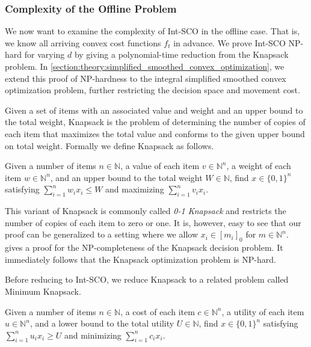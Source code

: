 \subsubsection{Complexity of the Offline Problem}

We now want to examine the complexity of Int-SCO in the offline case. That is, we know all arriving convex cost functions $f_t$ in advance. We prove Int-SCO NP-hard for varying $d$ by giving a polynomial-time reduction from the Knapsack problem. In \cref{section:theory:simplified_smoothed_convex_optimization}, we extend this proof of NP-hardness to the integral simplified smoothed convex optimization problem, further restricting the decision space and movement cost.

Given a set of items with an associated value and weight and an upper bound to the total weight, Knapsack is the problem of determining the number of copies of each item that maximizes the total value and conforms to the given upper bound on total weight. Formally we define Knapsack as follows.

\begin{problem}[Knapsack (KP)]
Given a number of items $n \in \mathbb{N}$, a value of each item $v \in \mathbb{N}^n$, a weight of each item $w \in \mathbb{N}^n$, and an upper bound to the total weight $W \in \mathbb{N}$, find $x \in \{0,1\}^n$ satisfying $\sum_{i = 1}^n w_i x_i \leq W$ and maximizing $\sum_{i=1}^n v_i x_i$.
\end{problem}

This variant of Knapsack is commonly called \emph{0-1 Knapsack} and restricts the number of copies of each item to zero or one. It is, however, easy to see that our proof can be generalized to a setting where we allow $x_i \in [m_i]_0$ for $m \in \mathbb{N}^n$. \citeauthor*{Williamson2014}~\cite{Williamson2014} gives a proof for the NP-completeness of the Knapsack decision problem. It immediately follows that the Knapsack optimization problem is NP-hard.

Before reducing to Int-SCO, we reduce Knapsack to a related problem called Minimum Knapsack.

\begin{problem}
Given a number of items $n \in \mathbb{N}$, a cost of each item $c \in \mathbb{N}^n$, a utility of each item $u \in \mathbb{N}^n$, and a lower bound to the total utility $U \in \mathbb{N}$, find $x \in \{0,1\}^n$ satisfying $\sum_{i = 1}^n u_i x_i \geq U$ and minimizing $\sum_{i=1}^n c_i x_i$.
\end{problem}

